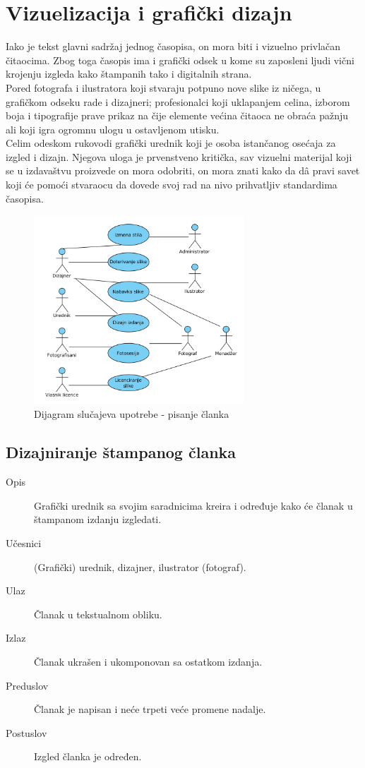 \section{Vizuelizacija i grafički dizajn}
Iako je tekst glavni sadržaj jednog časopisa, on mora biti i vizuelno privlačan čitaocima. Zbog toga časopis ima i grafički odsek u kome su zaposleni ljudi vični krojenju izgleda kako štampanih tako i digitalnih strana. \\

Pored fotografa i ilustratora koji stvaraju potpuno nove slike iz ničega, u grafičkom odseku rade i dizajneri; profesionalci koji uklapanjem celina, izborom boja i tipografije prave prikaz na čije elemente većina čitaoca ne obraća pažnju ali koji igra ogromnu ulogu u ostavljenom utisku. \\

Celim odeskom rukovodi grafički urednik koji je osoba istančanog osećaja za izgled i dizajn. Njegova uloga je prvenstveno kritička, sav vizuelni materijal koji se u izdavaštvu proizvede on mora odobriti, on mora znati kako da d\^{a} pravi savet koji će pomoći stvaraocu da dovede svoj rad na nivo prihvatljiv standardima časopisa.


\begin{figure}[htb]
    \centering
    \includegraphics[width=0.7\textwidth]{slike/upotreba_grafika}
    \caption{Dijagram slučajeva upotrebe - pisanje članka}
    \label{grafika}
\end{figure}

\subsection{Dizajniranje štampanog članka}
\begin{description}
\item [Opis] Grafički urednik sa svojim saradnicima kreira i određuje kako će članak u štampanom izdanju izgledati.
\item [Učesnici] (Grafički) urednik, dizajner, ilustrator (fotograf).
\item [Ulaz] Članak u tekstualnom obliku.
\item [Izlaz] Članak ukrašen i ukomponovan sa ostatkom izdanja.
\item [Preduslov] Članak je napisan i neće trpeti veće promene nadalje.
\item [Postuslov] Izgled članka je određen.
\end{description}
